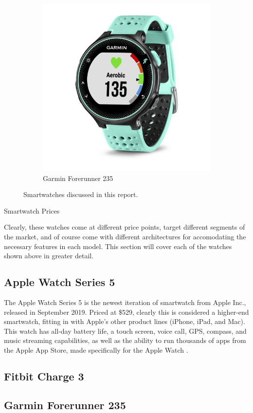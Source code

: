 \begin{figure}[h]
\begin{subfigure}{.5\textwidth}
        \centering
        \includegraphics[width=.4\linewidth]{media/garmin_pic.jpeg}
        \caption{Garmin Forerunner 235 \cite{garmin_price}}
        \label{fig:sub3}
      \end{subfigure}
    \caption{Smartwatches discussed in this report.}
    \label{watches:pictures}
\end{figure}

\begin{table}[h]
    \centering
    \caption{Smartwatch Prices}
    \label{watch:price} 
\end{table}

Clearly, these watches come at different price points, target different segments of the market, and
of course come with different architectures for accomodating the necessary features in each model. This
section will cover each of the watches shown above in greater detail.

\subsection{Apple Watch Series 5}
The Apple Watch Series 5 is the newest iteration of smartwatch from Apple Inc., released in September
2019. Priced at \$529, clearly this is considered a higher-end smartwatch, fitting in with Apple's
other product lines (iPhone, iPad, and Mac). This watch has all-day battery life, a touch screen, 
voice call, GPS, compass, and music streaming capabilities, as well as the ability to run thousands of
apps from the Apple App Store, made specifically for the Apple Watch \cite{apple_specs}. 

\subsection{Fitbit Charge 3}

\subsection{Garmin Forerunner 235}